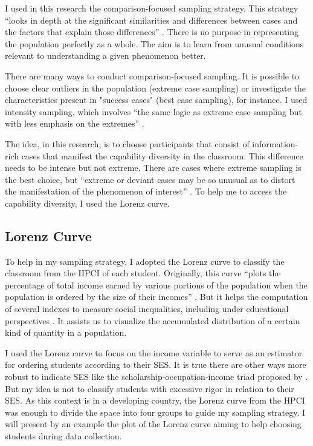         


I used in this research the comparison-focused sampling strategy. This strategy “looks in depth at the significant similarities and differences between cases and the factors that explain those differences” \cite[p.~418]{patton:2015}. There is no purpose in representing the population perfectly as a whole. The aim is to learn from unusual conditions relevant to understanding a given phenomenon better.

There are many ways to conduct comparison-focused sampling. It is possible to choose clear outliers in the population (extreme case sampling) or investigate the characteristics present in "success cases" (best case sampling), for instance. I used intensity sampling, which involves “the same logic as extreme case sampling but with less emphasis on the extremes” \cite[p.~422]{patton:2015}.

The idea, in this research, is to choose participants that consist of information-rich cases that manifest the capability diversity in the classroom. This difference needs to be intense but not extreme. There are cases where extreme sampling is the best choice, but “extreme or deviant cases may be so unusual as to distort the manifestation of the phenomenon of interest” \cite[p.~422]{patton:2015}. To help me to access the capability diversity, I used the Lorenz curve.

\subsection{Lorenz Curve}
\label{res-meth-ss:lorenz}

To help in my sampling strategy, I adopted the Lorenz curve to classify the classroom from the \acrfull{HPCI} of each student. Originally, this curve “plots the percentage of total income earned by various portions of the population when the population is ordered by the size of their incomes” \cite{gastwirth:1971}. But it helps the computation of several indexes to measure social inequalities, including under educational perspectives \cite{thomas:2003}. It assists us to visualize the accumulated distribution of a certain kind of quantity in a population. 

I used the Lorenz curve to focus on the income variable to serve as an estimator for ordering students according to their \acrfull{SES}. It is true there are other ways more robust to indicate \gls{SES} like the scholarship-occupation-income triad proposed by . But my idea is not to classify students with excessive rigor in relation to their \gls{SES}. As this context is in a developing country, the Lorenz curve from the \gls{HPCI} was enough to divide the space into four groups to guide my sampling strategy. I will present by an example the plot of the Lorenz curve aiming to help choosing students during data collection.

